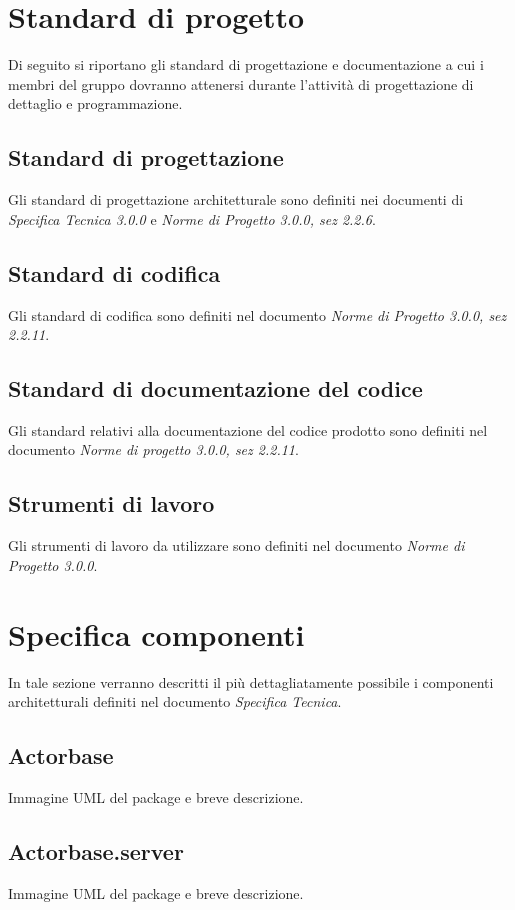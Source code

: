 \documentclass[a4paper]{article}
\begin{document}
	\newpage	
	
	\section{Standard di progetto}
		Di seguito si riportano gli standard di progettazione e documentazione a cui i membri del gruppo dovranno attenersi durante l'attività di progettazione di dettaglio e programmazione.
	\subsection{Standard di progettazione}
		Gli standard di progettazione architetturale sono definiti nei documenti di \emph{Specifica Tecnica 3.0.0} e \emph{Norme di Progetto 3.0.0, sez 2.2.6}.  
	\subsection{Standard di codifica}
		Gli standard di codifica sono definiti nel documento \emph{Norme di Progetto 3.0.0, sez 2.2.11}.
	\subsection{Standard di documentazione del codice}
		Gli standard relativi alla documentazione del codice prodotto sono definiti nel documento \emph{Norme di progetto 3.0.0, sez 2.2.11}.
	\subsection{Strumenti di lavoro}
		Gli strumenti di lavoro da utilizzare sono definiti nel documento \emph{Norme di Progetto 3.0.0}.
		
	\newpage
	
	\section{Specifica componenti}
		In tale sezione verranno descritti il più dettagliatamente possibile i componenti architetturali definiti nel documento \emph{Specifica Tecnica}.
		
	\subsection{Actorbase}
		Immagine UML del package e breve descrizione.
		
	\subsection{Actorbase.server}
		Immagine UML del package e breve descrizione.
		
\end{document}
